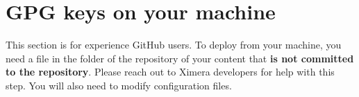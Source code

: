 \documentclass{ximera}
\begin{document}
\pdfOnly{\twocolumn} %

\section{GPG keys on your machine}

This section is for experience GitHub users. To deploy from your machine, you
need a file in
the folder of the repository of
your content that \textbf{is not committed to the repository}. Please reach out
to Ximera developers for help with this step. You will also need to modify
configuration files.

\end{document}
